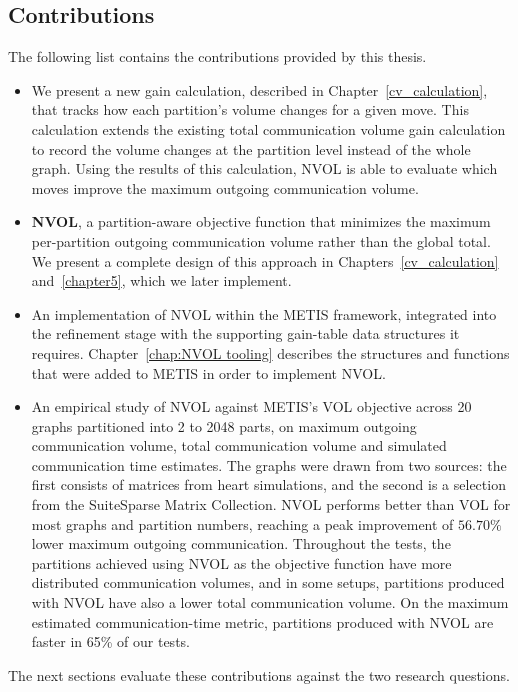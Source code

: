 \subsection{Contributions}
The following list contains the contributions provided by this thesis.
\begin{itemize}
	\item  We present a new gain calculation, described in Chapter~\ref{cv_calculation}, that tracks how each partition's volume changes for a given move. This calculation extends the existing total communication volume gain calculation to record the volume changes at the partition level instead of the whole graph. Using the results of this calculation, NVOL is able to evaluate which moves improve the maximum outgoing communication volume. 
	
	\item \textbf{NVOL}, a partition-aware objective function that minimizes the maximum per-partition outgoing communication volume rather than the global total. We present a complete design of this approach in Chapters~\ref{cv_calculation} and~\ref{chapter5}, which we later implement. 
	
	\item An implementation of NVOL within the METIS framework, integrated into the refinement stage with the supporting gain-table data structures it requires. Chapter~\ref{chap:NVOL tooling} describes the structures and functions that were added to METIS in order to implement NVOL. 
		
	\item An empirical study of NVOL against METIS's VOL objective across 20 graphs partitioned into 2 to 2048 parts, on maximum outgoing communication volume, total communication volume and simulated communication time estimates. The graphs were drawn from two sources: the first consists of matrices from heart simulations, and the second is a selection from the SuiteSparse Matrix Collection. NVOL performs better than VOL for most graphs and partition numbers, reaching a peak improvement of $56.70\%$ lower maximum outgoing communication. Throughout the tests, the partitions achieved using NVOL as the objective function have more distributed communication volumes, and in some setups, partitions produced with NVOL have also a lower total communication volume. On the maximum estimated communication-time metric, partitions produced with NVOL are faster in 65\% of our tests.
\end{itemize} 

The next sections evaluate these contributions against the two research questions.
